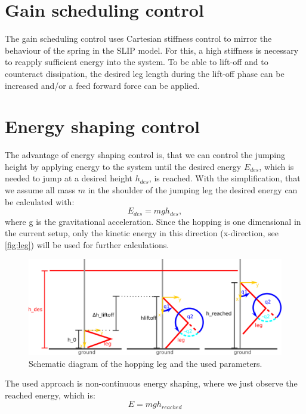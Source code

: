 \documentclass[onecolumn, letter paper]{report}
\begin{document}
\section{Gain scheduling control}
The gain scheduling control uses Cartesian stiffness control to mirror the behaviour of the spring in the SLIP model. For this, a high stiffness is necessary to reapply sufficient energy into the system. To be able to lift-off and to counteract dissipation, the desired leg length during the lift-off phase can be increased and/or a feed forward force can be applied.



\section{Energy shaping control}
The advantage of energy shaping control is, that we can control the jumping height by applying energy to the system until the desired energy $E_{des}$, which is needed to jump at a desired height $h_{des}$, is reached.
With the simplification, that we assume all mass $m$ in the shoulder of the jumping leg the desired energy can be calculated with:
\begin{equation}
    E_{des} = m g h_{des},
\end{equation}
where g is the gravitational acceleration. Since  the hopping is one dimensional in the current setup, only the kinetic energy in this direction (x-direction, see \autoref{fig:leg}) will be used for further calculations.

\begin{figure}[htb!]
    \centering
    \includegraphics[width=\textwidth]{figures/hopping_leg_seq.png}
    \caption{Schematic diagram of the hopping leg and the used parameters.}
    \label{fig:leg}
\end{figure}

The used approach is non-continuous energy shaping, where we just observe the reached energy, which is: 
\begin{equation}
    E = m g h_{reached}
\end{equation}
\end{document}
